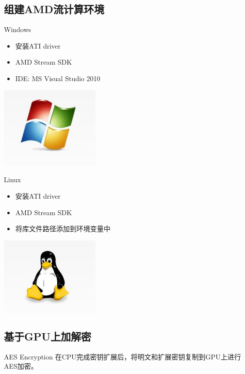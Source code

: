 \documentclass{beamer}
\begin{document}
\subsection{组建AMD流计算环境}

\begin{frame}{Windows}
     \begin{itemize}
     \item 安装ATI driver
     \item AMD Stream SDK
     \item IDE: MS Visual Studio 2010
     \end{itemize}
     \centering
     \includegraphics[width=5cm]{windows.jpg}
\end{frame}


\begin{frame}{Linux}
     \begin{itemize}
     \item 安装ATI driver
     \item AMD Stream SDK
     \item 将库文件路径添加到环境变量中
     \end{itemize}
     \centering
     \includegraphics[width=5cm]{linux.jpg}
\end{frame}

\subsection{基于GPU上加解密}

\begin{frame}{AES Encryption}
在CPU完成密钥扩展后，将明文和扩展密钥复制到GPU上进行AES加密。

\end{frame}
\end{document}
